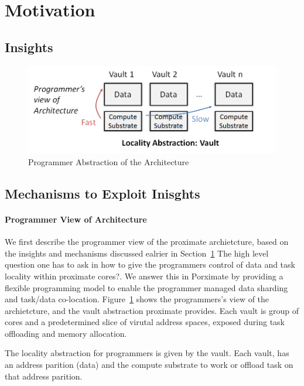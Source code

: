 \section{Motivation} \label{sec:motiv}

\subsection{Insights}

\begin{figure}
  \begin{center}
    \includegraphics[width=\linewidth]{cs758-figs/prog-abs.png}
  \end{center}
\vspace{-0.2in}
  \caption{Programmer Abstraction of the Architecture}
  \label{fig:prog-overview}
\vspace{-0.05in}
\end{figure}


\subsection{Mechanisms to Exploit Inisghts}

\paragraph{Programmer View of Architecture}
We first describe the programmer view of the proximate archietcture, 
based on the insights and mechanisms discussed ealrier in Section~\ref{sec:motiv} 
The high level question one has to ask in how to give the programmers control
of data and task locality within proximate cores?. We answer this
in Porximate by providing a flexible programming model to enable the 
programmer managed data sharding and task/data co-location. 
Figure~\ref{fig:prog-overview} shows the programmers's view of the archietcture, 
and the vault abstraction proximate provides. Each vault is group of cores
and a predetermined slice of virutal address spaces, exposed during task offloading 
and memory allocation. 

The locality abstraction for programmers is given by the vault. Each vault, 
has an address parition (data) and the compute substrate to work or offload task
on that address parition. 


